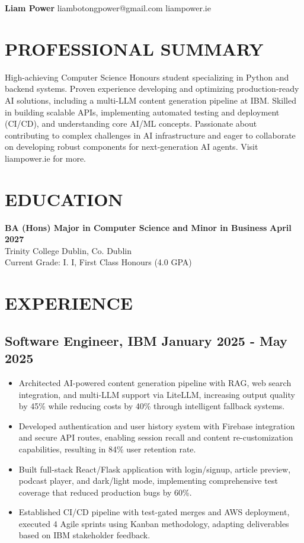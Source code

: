 \documentclass[10pt,a4paper]{article}
\begin{document}
\begin{center}
{\large\bfseries Liam Power} \hfill {\large liambotongpower@gmail.com} \hfill {\large liampower.ie}
\end{center}

\section{PROFESSIONAL SUMMARY} 

High-achieving Computer Science Honours student specializing in Python and backend systems. Proven experience developing and optimizing production-ready AI solutions, including a multi-LLM content generation pipeline at IBM. Skilled in building scalable APIs, implementing automated testing and deployment (CI/CD), and understanding core AI/ML concepts. Passionate about contributing to complex challenges in AI infrastructure and eager to collaborate on developing robust components for next-generation AI agents. Visit liampower.ie for more.


\section{EDUCATION}

\textbf{BA (Hons) Major in Computer Science and Minor in Business} \hfill \textbf{April 2027}\\
Trinity College Dublin, Co. Dublin\\
Current Grade: I. I, First Class Honours (4.0 GPA)

\section{EXPERIENCE}

\subsection{Software Engineer, IBM \hfill January 2025 - May 2025}
\begin{itemize}
\item Architected AI-powered content generation pipeline with RAG, web search integration, and multi-LLM support via LiteLLM, increasing output quality by 45\% while reducing costs by 40\% through intelligent fallback systems.
\item Developed authentication and user history system with Firebase integration and secure API routes, enabling session recall and content re-customization capabilities, resulting in 84\% user retention rate.
\item Built full-stack React/Flask application with login/signup, article preview, podcast player, and dark/light mode, implementing comprehensive test coverage that reduced production bugs by 60\%.
\item Established CI/CD pipeline with test-gated merges and AWS deployment, executed 4 Agile sprints using Kanban methodology, adapting deliverables based on IBM stakeholder feedback.
\end{itemize}
\end{document}
